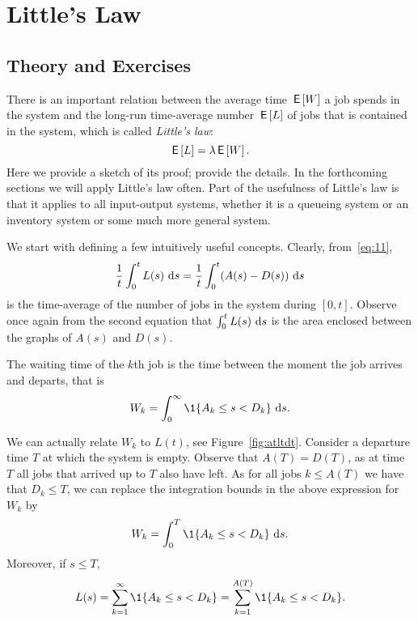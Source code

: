\section{Little's Law}
\label{sec:littles-law}

\subsection*{Theory and Exercises}



There is an important relation between the average time $\,\mathsf{E}\left[W\right]$ a job
spends in the system and the long-run time-average number $\,\mathsf{E}\left[L\right]$ of jobs
that is contained in the system, which is called \emph{Little's law}:
\begin{equation}\label{eq:53}
  \,\mathsf{E}\left[L\right] = \lambda \,\mathsf{E}\left[W\right].
\end{equation}
Here we provide a sketch of its proof; 
\cite{el-taha98:_sampl_path_analy_queuein_system} provide the details. In
the forthcoming sections we will apply Little's law often. Part of the
usefulness of Little's law is that it applies to all input-output
systems, whether it is a queueing system or an inventory system or
some much more general system.

We start with defining a few intuitively useful concepts.  Clearly, from~\eqref{eq:11}, 
\begin{equation*}
\frac 1 t\int_0^t L(s)\, \,\text{d}s =  \frac 1 t\int_0^t (A(s)-D(s)) \, \,\text{d}s
\end{equation*}
is the time-average of the number of jobs in the system during
$[0,t]$. Observe once again from the second equation that
$\int_0^t L(s)\,\,\text{d}s$ is the area enclosed between the graphs of $A(s)$
and $D(s)$.


The waiting time of the $k$th job is the time between the moment the
job arrives and departs, that is
\begin{equation*}
  W_k = \int_0^\infty \1{A_k \leq s < D_k}\,\d s.
\end{equation*}

We can actually relate $W_k$ to $L(t)$, see
Figure~\ref{fig:atltdt}. Consider a departure time $T$ at which the
system is empty. Observe that $A(T) = D(T)$, as at time $T$ all jobs
that arrived up to $T$ also have left. As for all jobs $k\leq A(T)$
we have that $D_k \leq T$,  we can replace the integration
bounds in the above expression for $W_k$ by
\begin{equation*}
  W_k = \int_0^T \1{A_k \leq s < D_k}\,\d s.
\end{equation*}
Moreover, if $s\leq T$,
\begin{equation*}
L(s) = \sum_{k=1}^\infty \1{A_k \leq s < D_k} = \sum_{k=1}^{A(T)}\1{A_k \leq s < D_k}.
\end{equation*}

